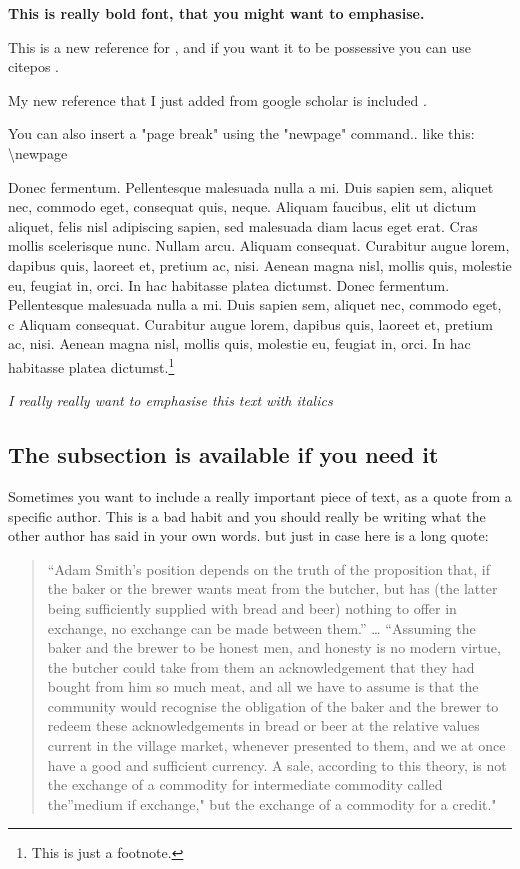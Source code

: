 \documentclass[english,a4paper,12pt]{article}
\makeatletter
\DeclareRobustCommand\citepos
  {\begingroup
   \let\NAT@nmfmt\NAT@posfmt%
   \NAT@swafalse\let\NAT@ctype\z@\NAT@partrue
   \@ifstar{\NAT@fulltrue\NAT@citetp}{\NAT@fullfalse\NAT@citetp}}
\let\NAT@orig@nmfmt\NAT@nmfmt
\def\NAT@posfmt#1{\NAT@orig@nmfmt{#1's}}
\makeatother
\begin{document}
\textbf{This is really bold font, that you might want to emphasise.}

This is a new reference for \cite{khalilkinsella2015}, and if you want it to be possessive you can use citepos \citepos{khalilkinsella2015}.

My new reference that I just added from google scholar is included \citep[p.~75]{malkiel1989efficient}.

You can also insert a "page break" using the "newpage" command.. like this: \textbackslash newpage

\newpage
Donec fermentum. Pellentesque malesuada nulla a mi. Duis sapien sem, aliquet nec, commodo eget, consequat quis, neque. Aliquam faucibus, elit ut dictum aliquet, felis nisl adipiscing sapien, sed malesuada diam lacus eget erat. Cras mollis scelerisque nunc. Nullam arcu. Aliquam consequat. Curabitur augue lorem, dapibus quis, laoreet et, pretium ac, nisi. Aenean magna nisl, mollis quis, molestie eu, feugiat in, orci. In hac habitasse platea dictumst.
 \citep{chick2003}
Donec fermentum. Pellentesque malesuada nulla a mi. Duis sapien sem, aliquet nec, commodo eget, c Aliquam consequat. Curabitur augue lorem, dapibus quis, laoreet et, pretium ac, nisi. Aenean magna nisl, mollis quis, molestie eu, feugiat in, orci. In hac habitasse platea dictumst.\footnote{This is just a footnote.}

\emph{I really really want to emphasise this text with italics}

\subsection{The subsection is available if you need it}

Sometimes you want to include a really important piece of text, as a quote from a specific author. This is a bad habit and you should really be writing what the other author has said in your own words. but just in case here is a long quote:

\begin{quote}
``Adam Smith's position depends on the truth of the proposition that, if
the baker or the brewer wants meat from the butcher, but has (the latter
being sufficiently supplied with bread and beer) nothing to offer in
exchange, no exchange can be made between them.'' \ldots{} ``Assuming
the baker and the brewer to be honest men, and honesty is no modern
virtue, the butcher could take from them an acknowledgement that they
had bought from him so much meat, and all we have to assume is that the
community would recognise the obligation of the baker and the brewer to
redeem these acknowledgements in bread or beer at the relative values
current in the village market, whenever presented to them, and we at
once have a good and sufficient currency. A sale, according to this
theory, is not the exchange of a commodity for intermediate commodity
called the''medium if exchange," but the exchange of a commodity for a
credit."
\end{quote}
\end{document}
